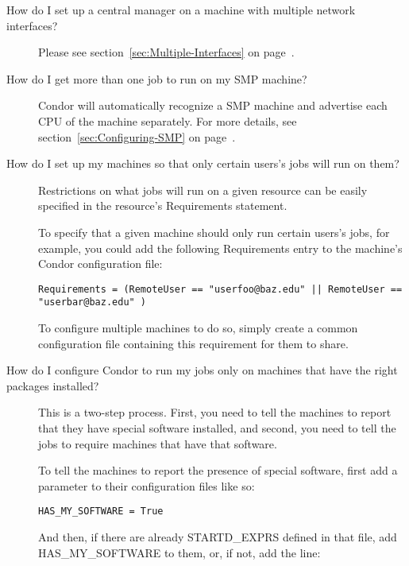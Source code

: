 \begin{description}
\item[How do I set up a central manager on a machine with multiple network interfaces?]

Please see section~\ref{sec:Multiple-Interfaces} on 
page~\pageref{sec:Multiple-Interfaces}.

\item[How do I get more than one job to run on my SMP machine?]

Condor will automatically recognize a SMP machine and advertise each
CPU of the machine separately.
For more details, see section~\ref{sec:Configuring-SMP} on
page~\pageref{sec:Configuring-SMP}.

\item[How do I set up my machines so that only certain users's jobs will run on them?]

Restrictions on what jobs will run on a given resource can be easily
specified in the resource's Requirements statement.

To specify that a given machine should only run certain users's jobs,
for example, you could add the following Requirements entry to the
machine's Condor configuration file:

\begin{verbatim}Requirements = (RemoteUser == "userfoo@baz.edu" || RemoteUser == "userbar@baz.edu" )\end{verbatim}

To configure multiple machines to do so, simply create a common
configuration file containing this requirement for them to share.

\item[How do I configure Condor to run my jobs only on machines that have the right packages installed?]

This is a two-step process.
First, you need to tell the machines to report that they have special
software installed, and second, you need to tell the jobs to require
machines that have that software.

To tell the machines to report the presence of special software, first
add a parameter to their configuration files like so:

\begin{verbatim}HAS_MY_SOFTWARE = True\end{verbatim}

And then, if there are already STARTD\_EXPRS defined in that file, add
HAS\_MY\_SOFTWARE to them, or, if not, add the line:


\end{description}
